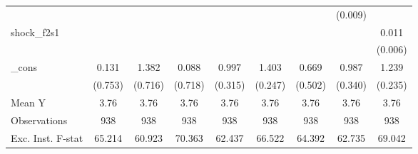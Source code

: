 {\begin{tabular}{l*{8}{c}}
            &                     &                     &                     &                     &                     &                     &     (0.009)         &                     \\
\addlinespace
shock\_f2s1  &                     &                     &                     &                     &                     &                     &                     &       0.011\sym{*}  \\
            &                     &                     &                     &                     &                     &                     &                     &     (0.006)         \\
\addlinespace
\_cons      &       0.131         &       1.382\sym{*}  &       0.088         &       0.997\sym{***}&       1.403\sym{***}&       0.669         &       0.987\sym{***}&       1.239\sym{***}\\
            &     (0.753)         &     (0.716)         &     (0.718)         &     (0.315)         &     (0.247)         &     (0.502)         &     (0.340)         &     (0.235)         \\
\midrule
Mean Y      &        3.76         &        3.76         &        3.76         &        3.76         &        3.76         &        3.76         &        3.76         &        3.76         \\
Observations&         938         &         938         &         938         &         938         &         938         &         938         &         938         &         938         \\
Exc. Inst. F-stat&      65.214         &      60.923         &      70.363         &      62.437         &      66.522         &      64.392         &      62.735         &      69.042         \\
\bottomrule
\end{tabular}
}
